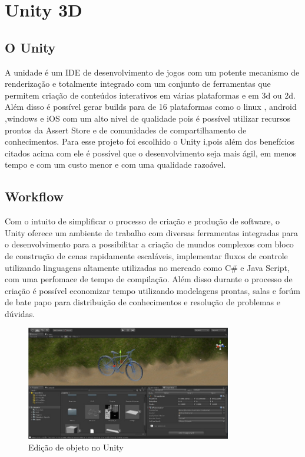 \section{Unity 3D} %
\label{sec:unity_3d}

\subsection{O Unity }
\label{sub:o_unity}
	A unidade é um IDE de desenvolvimento de jogos com um potente mecanismo de renderização e totalmente integrado com um conjunto de ferramentas que permitem criação de conteúdos interativos em várias plataformas e em  3d ou 2d. Além disso é possível gerar builds para de 16 plataformas  como o linux , android ,windows e iOS com um alto nivel de qualidade pois é possível utilizar recursos prontos da Assert Store e de comunidades de compartilhamento de conhecimentos. 
	Para esse projeto foi escolhido o Unity i,pois  além dos benefícios citados acima com ele é possível que o desenvolvimento seja mais ágil, em menos tempo e com um custo menor e com uma qualidade razoável. 

\subsection{Workflow} %
\label{sub:workflow}
	Com o intuito de simplificar o processo de criação e produção de software, o Unity oferece um ambiente de trabalho com diversas ferramentas integradas para o desenvolvimento para a possibilitar a criação de mundos complexos com bloco de construção de cenas rapidamente escaláveis, implementar fluxos de controle utilizando linguagens altamente utilizadas no mercado como C\# e Java Script, com uma perfomace de tempo de compilação. Além disso durante o processo de criação é possível economizar tempo utilizando modelagens prontas, salas e forúm de bate papo para distribuição de conhecimentos e resolução de problemas e dúvidas.

\begin{figure}[h]
  \centering
  \includegraphics[width=0.8\textwidth]
      {figuras/bike.png}
  \caption{Edição de objeto no Unity}
  \label{coordenadas-rift}
\end{figure}

